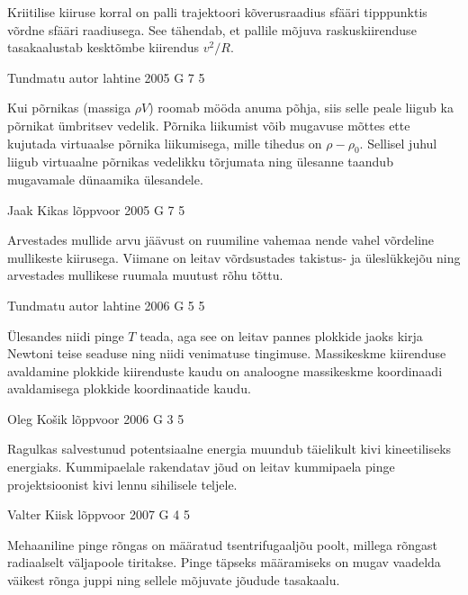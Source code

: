 \documentclass[11pt, twoside]{article}
\begin{document}
{{\ifHint
Kriitilise kiiruse korral on palli trajektoori kõverusraadius sfääri tipppunktis võrdne sfääri raadiusega. See tähendab, et pallile mõjuva raskuskiirenduse tasakaalustab kesktõmbe kiirendus $v^2/R$.
\fi
}

{Tundmatu autor} %
{lahtine} %
{2005} %
{G 7} %
{5} %
{

\ifHint
Kui põrnikas (massiga $\rho V$) roomab mööda anuma põhja, siis selle peale liigub ka põrnikat ümbritsev vedelik. Põrnika liikumist võib mugavuse mõttes ette kujutada virtuaalse põrnika liikumisega, mille tihedus on $\rho - \rho_0$. Sellisel juhul liigub virtuaalne põrnikas vedelikku tõrjumata ning ülesanne taandub mugavamale dünaamika ülesandele.
\fi
}

{Jaak Kikas} %
{lõppvoor} %
{2005} %
{G 7} %
{5} %
{

\ifHint
Arvestades mullide arvu jäävust on ruumiline vahemaa nende vahel võrdeline mullikeste kiirusega. Viimane on leitav võrdsustades takistus- ja üleslükkejõu ning arvestades mullikese ruumala muutust rõhu tõttu.
\fi
}

{Tundmatu autor} %
{lahtine} %
{2006} %
{G 5} %
{5} %
{

\ifHint
Ülesandes niidi pinge $T$ teada, aga see on leitav pannes plokkide jaoks kirja Newtoni teise seaduse ning niidi venimatuse tingimuse. Massikeskme kiirenduse avaldamine plokkide kiirenduste kaudu on analoogne massikeskme koordinaadi avaldamisega plokkide koordinaatide kaudu.
\fi
}

{Oleg Košik} %
{lõppvoor} %
{2006} %
{G 3} %
{5} %
{

\ifHint
Ragulkas salvestunud potentsiaalne energia muundub täielikult kivi kineetiliseks energiaks. Kummipaelale rakendatav jõud on leitav kummipaela pinge projektsioonist kivi lennu sihilisele teljele.
\fi
}

{Valter Kiisk} %
{lõppvoor} %
{2007} %
{G 4} %
{5} %
{

\ifHint
Mehaaniline pinge rõngas on määratud tsentrifugaaljõu poolt, millega rõngast radiaalselt väljapoole tiritakse. Pinge täpseks määramiseks on mugav vaadelda väikest rõnga juppi ning sellele mõjuvate jõudude tasakaalu.
\fi
}

}
\end{document}
